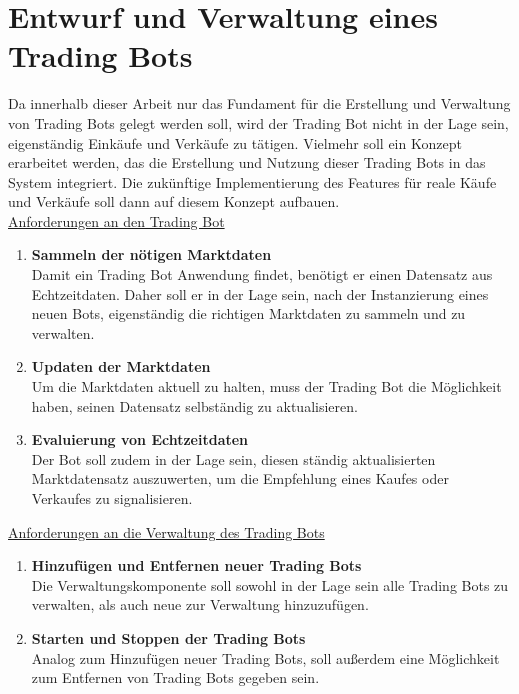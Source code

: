 \documentclass[oneside]{ausarbeitung}
\begin{document}

\section{Entwurf und Verwaltung eines Trading Bots}
\label{sec:trading_bot}

Da innerhalb dieser Arbeit nur das Fundament für die Erstellung und
Verwaltung von Trading Bots gelegt werden soll, wird der Trading Bot
nicht in der Lage sein, eigenständig Einkäufe und Verkäufe zu
tätigen. Vielmehr soll ein Konzept erarbeitet werden, das die
Erstellung und Nutzung dieser Trading Bots in das System integriert.
Die zukünftige Implementierung des Features für reale Käufe und
Verkäufe soll dann auf diesem Konzept aufbauen. \\

\underline{Anforderungen an den Trading Bot}
\begin{enumerate}
	\item \textbf{Sammeln der nötigen Marktdaten} \\
		Damit ein Trading Bot Anwendung findet, benötigt er einen Datensatz aus
		Echtzeitdaten. Daher soll er in der Lage sein, nach der Instanzierung
		eines neuen Bots, eigenständig die richtigen Marktdaten zu sammeln und zu
		verwalten.
	\item \textbf{Updaten der Marktdaten} \\
		Um die Marktdaten aktuell zu halten, muss der Trading Bot die Möglichkeit
		haben, seinen Datensatz selbständig zu aktualisieren.
	\item \textbf{Evaluierung von Echtzeitdaten} \\
		Der Bot soll zudem in der Lage sein, diesen ständig aktualisierten
		Marktdatensatz auszuwerten, um die Empfehlung eines Kaufes oder Verkaufes
		zu signalisieren. \\
\end{enumerate}

\underline{Anforderungen an die Verwaltung des Trading Bots}
\begin{enumerate}
	\item \textbf{Hinzufügen und Entfernen neuer Trading Bots} \\
		Die Verwaltungskomponente soll sowohl in der Lage sein alle Trading Bots 
		zu verwalten, als auch neue zur Verwaltung hinzuzufügen.
	\item \textbf{Starten und Stoppen der Trading Bots} \\
		Analog zum Hinzufügen neuer Trading Bots, soll außerdem eine Möglichkeit 
		zum Entfernen von Trading Bots gegeben sein. \\
\end{enumerate}
\end{document}
